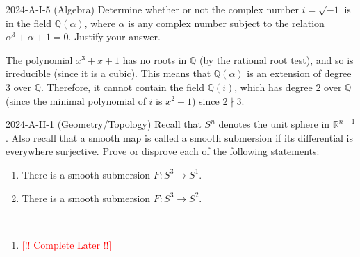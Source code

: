\documentclass{article}
\begin{document}
\begin{prb}{2024-A-I-5 (Algebra)}
	Determine whether or not the complex number $i = \sqrt{-1}$ is in the field $\mathbb{Q}(\alpha)$, where $\alpha$ is any complex number subject to the relation $\alpha^{3} + \alpha + 1 = 0$. Justify your answer. 
\end{prb}
\begin{solutions}
	The polynomial $x^{3} + x + 1$ has no roots in $\mathbb{Q}$ (by the rational root test), and so is irreducible (since it is a cubic). This means that $\mathbb{Q}(\alpha)$ is an extension of degree 3 over $\mathbb{Q}$. Therefore, it cannot contain the field $\mathbb{Q}(i)$, which has degree $2$ over $\mathbb{Q}$ (since the minimal polynomial of $i$ is $x^{2} + 1$) since $2 \nmid 3$. 
\end{solutions}
\begin{prb}{2024-A-II-1 (Geometry/Topology)}
	Recall that $S^{n}$ denotes the unit sphere in $\mathbb{R}^{n + 1}$. Also recall that a smooth map is called a smooth submersion if its differential is everywhere surjective. Prove or disprove each of the following statements: \vspace{-0.25cm}
		\begin{enumerate}[itemsep =-2pt,label = (\alph{*})]
			\item There is a smooth submersion $F: S^{3} \to S^{1}$. 
			\item There is a smooth submersion $F: S^{3} \to S^{2}$. 
		\end{enumerate}
\end{prb}
\begin{solutions}
	$ $\newline \vspace{-1cm}
	\begin{enumerate}[itemsep =-2pt,label = (\alph{*})]
		\item \textcolor{red}{[!! Complete Later !!]}
	\end{enumerate}
\end{solutions}
\end{document}
